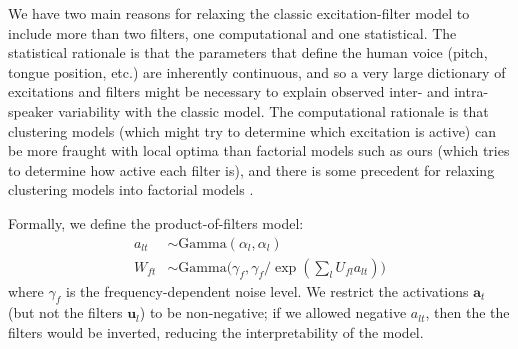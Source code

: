 \documentclass{article} %
\begin{document}
We have two main reasons for relaxing the classic excitation-filter
model to include more than two filters, one computational and one
statistical. The statistical rationale is that the parameters that
define the human voice (pitch, tongue position, etc.) are inherently
continuous, and so a very large dictionary of excitations and filters
might be necessary to explain observed inter- and intra-speaker
variability with the classic model. The computational rationale is
that clustering models (which might try to determine which excitation
is active) can be more fraught with local optima than factorial models
such as ours (which tries to determine how active each filter is), and
there is some precedent for relaxing clustering models into factorial
models \cite{ding2004k}.

Formally, we define the product-of-filters model:
\begin{equation} \label{eq:model}
\begin{split}
a_{lt} &\sim \text{Gamma}(\alpha_l, \alpha_l)\\
W_{ft} &\sim \text{Gamma}\Big(\gamma_f, \gamma_f / \exp(\textstyle{\sum_l} U_{fl} a_{lt})\Big) 
\end{split}
\end{equation}
where $\gamma_f$ is the frequency-dependent noise level. We restrict
the activations $\bm{a}_t$ (but not the filters
$\bm{u}_l$) to be non-negative; if we allowed negative $a_{lt}$, then
the the filters would be inverted, reducing the interpretability of
the model.
\end{document}
